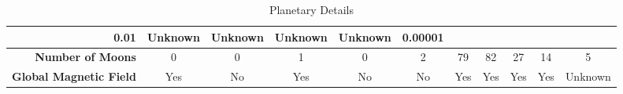 \begin{landscape}
\begin{table}[H]
\begin{tabular}{|r|c|c|c|c|c|c|c|c|c|c|}
  \cellcolor[HTML]{F5F5F5}0.01 &
  \cellcolor[HTML]{FFFFFF}Unknown &
  \cellcolor[HTML]{F5F5F5}Unknown &
  \cellcolor[HTML]{FFFFFF}Unknown &
  \cellcolor[HTML]{F5F5F5}Unknown &
  \cellcolor[HTML]{FFFFFF}0.00001 \\ \hline
\textbf{Number of Moons} &
  \cellcolor[HTML]{F5F5F5}0 &
  \cellcolor[HTML]{FFFFFF}0 &
  \cellcolor[HTML]{F5F5F5}1 &
  \cellcolor[HTML]{FFFFFF}0 &
  \cellcolor[HTML]{F5F5F5}2 &
  \cellcolor[HTML]{FFFFFF}79 &
  \cellcolor[HTML]{F5F5F5}82 &
  \cellcolor[HTML]{FFFFFF}27 &
  \cellcolor[HTML]{F5F5F5}14 &
  \cellcolor[HTML]{FFFFFF}5 \\ \hline
\textbf{Global Magnetic Field} &
  \cellcolor[HTML]{F5F5F5}Yes &
  \cellcolor[HTML]{FFFFFF}No &
  \cellcolor[HTML]{F5F5F5}Yes &
  \cellcolor[HTML]{FFFFFF}No &
  \cellcolor[HTML]{F5F5F5}No &
  \cellcolor[HTML]{FFFFFF}Yes &
  \cellcolor[HTML]{F5F5F5}Yes &
  \cellcolor[HTML]{FFFFFF}Yes &
  \cellcolor[HTML]{F5F5F5}Yes &
  \cellcolor[HTML]{FFFFFF}Unknown \\ \hline
\end{tabular}
\caption{Planetary Details}
\label{tab:db}
\end{table}
\end{landscape}